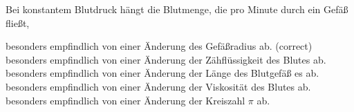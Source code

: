 \documentclass[11pt]{exam}
\begin{document}
\begin{questions}
\vspace{3mm}\question Bei konstantem Blutdruck hängt die Blutmenge, die pro Minute durch ein Gefäß fließt,

\begin{choices}
	\choice besonders empfindlich von einer Änderung des Gefäßradius ab. (correct)
	\choice besonders empfindlich von einer Änderung der Zähflüssigkeit des Blutes ab.
	\choice besonders empfindlich von einer Änderung der Länge des Blutgefäß es ab.
	\choice besonders empfindlich von einer Änderung der Viskosität des Blutes ab.
	\choice besonders empfindlich von einer Änderung der Kreiszahl \(\pi\) ab.
\end{choices}

\vspace{3mm}\end{questions}
\end{document}
